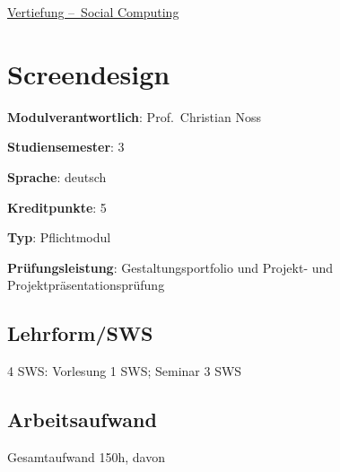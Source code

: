 \hyperref[/mi-2017/modulbeschreibungen-bachelor/BA_Vertiefung_SocialComputing]{Vertiefung – Social Computing}

\hypertarget{screendesignpathlabelmi-2017modulbeschreibungen-bachelorba_screendesign}{%
\chapter{Screendesign\label{/mi-2017/modulbeschreibungen-bachelor/BA_Screendesign}}\label{screendesignpathlabelmi-2017modulbeschreibungen-bachelorba_screendesign}}

\begin{modulHead}
\textbf{Modulverantwortlich}: Prof.~Christian
Noss
\end{modulHead}
\begin{modulHead}
\textbf{Studiensemester}:
3
\end{modulHead}
\begin{modulHead}
\textbf{Sprache}:
deutsch
\end{modulHead}
\begin{modulHead}
\textbf{Kreditpunkte}:
5
\end{modulHead}
\begin{modulHead}
\textbf{Typ}:
Pflichtmodul
\end{modulHead}
\begin{modulHead}
\textbf{Prüfungsleistung}:
Gestaltungsportfolio und Projekt- und
Projektpräsentationsprüfung
\end{modulHead}


\hypertarget{lehrformswspathlabelmi-2017modulbeschreibungen-bachelorba_screendesign}{%
\section*{Lehrform/SWS\label{/mi-2017/modulbeschreibungen-bachelor/BA_Screendesign}}\label{lehrformswspathlabelmi-2017modulbeschreibungen-bachelorba_screendesign}}

4 SWS: Vorlesung 1 SWS; Seminar 3 SWS

\hypertarget{arbeitsaufwandpathlabelmi-2017modulbeschreibungen-bachelorba_screendesign}{%
\section*{Arbeitsaufwand\label{/mi-2017/modulbeschreibungen-bachelor/BA_Screendesign}}\label{arbeitsaufwandpathlabelmi-2017modulbeschreibungen-bachelorba_screendesign}}

Gesamtaufwand 150h, davon

